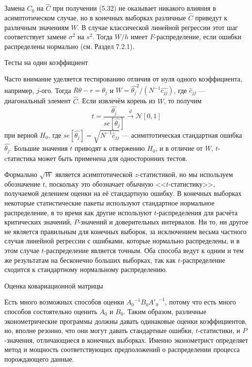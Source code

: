Замена $C_0$ на $\hat{C}$ при получении (5.32) не оказывает никакого влияния в асимптотическом случае, но в конечных выборках различные $\hat{C}$ приведут к различным значениям $W$. В случае классической линейной регрессии этот шаг соответствует замене $\sigma^2$ на $s^2$. Тогда $W/h$ имеет $F$-распределение, если ошибки распределены нормально (см. Раздел 7.2.1).

\begin{center}
Тесты на один коэффициент
\end{center}

Часто внимание уделяется тестированию отличия от нуля одного коэффициента, например, $j$-ого. Тогда $R \theta - r = \theta_j$ и $W=\hat{\theta_j}^2/(N^{-1}\hat{c_{jj}})$, где $\hat{c}_{jj}$ --- диагональный элемент $\hat{C}$. Если извлечём корень из $W$, то получим
\begin{equation}
t=\frac{\hat{\theta_j}}{se[\hat{\theta_j}]} \xrightarrow{d} \mathcal{N}[0,1]
\end{equation}
при верной $H_0$, где $se[\hat{\theta_j}]=\sqrt{N^{-1}\hat{c}_{jj}}$ --- асимптотическая стандартная ошибка $\hat{\theta_j}$. Большие значения $t$ приводят к отвержению $H_0$, и в отличие от $W$, $t$-cтатистика может быть применена для односторонних тестов.

Формально $\sqrt{W}$ является асимптотической $z$-статистикой, но мы используем обозначение $t$, поскольку это обозначает обычную <<$t$-статистику>>, получаемой делением оценки на её стандартную ошибку. В конечных выборках некоторые статистические пакеты используют стандартное нормальное распределение, в то время как другие используют $t$-распределения для расчёта критических значений, $P$-значений и доверительных интервалов. Ни то, ни другое не является правильным для конечных выборок, за исключением весьма частного случая линейной регрессии с ошибками, которые нормально распределены, и в этом случае $t$-распределение является точным. Оба способа ведут к одним и тем же результатам на бесконечно больших выборках, так как $t$-распределение сходится к стандартному нормальному распределению.

\begin{center}
Оценка ковариационной матрицы
\end{center}

Есть много возможных способов оценки ${A_0}^{-1} B_0 {A'_0}^{-1}$, потому что есть много способов состоятельно оценить $A_0$ и $B_0$. Таким образом, различные эконометрические программы  должны давать одинаковые оценки коэффициентов, но, вполне резонно, что они могут давать стандартные ошибки, $t$-статистики, и $P$-значения, отличающиеся в конечных выборках. Именно эконометрист определяет метод и мощность соответствующих предположений о распределении процесса порождающего данные.

